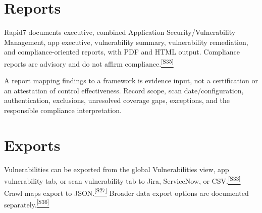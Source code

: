 \documentclass[11pt,letterpaper,oneside]{scrreprt}
\newcommand{\src}[1]{\hyperref[src:#1]{\textsuperscript{\color{R7Orange}[#1]}}}
\begin{document}
\section{Reports}
Rapid7 documents executive, combined Application Security/Vulnerability Management, app executive, vulnerability summary, vulnerability remediation, and compliance-oriented reports, with PDF and HTML output. Compliance reports are advisory and do not affirm compliance.\src{S35}

\begin{safetybox}
A report mapping findings to a framework is evidence input, not a certification or an attestation of control effectiveness. Record scope, scan date/configuration, authentication, exclusions, unresolved coverage gaps, exceptions, and the responsible compliance interpretation.
\end{safetybox}

\section{Exports}
Vulnerabilities can be exported from the global Vulnerabilities view, app vulnerability tab, or scan vulnerability tab to Jira, ServiceNow, or CSV.\src{S33} Crawl maps export to JSON.\src{S27} Broader data export options are documented separately.\src{S36}
\end{document}
